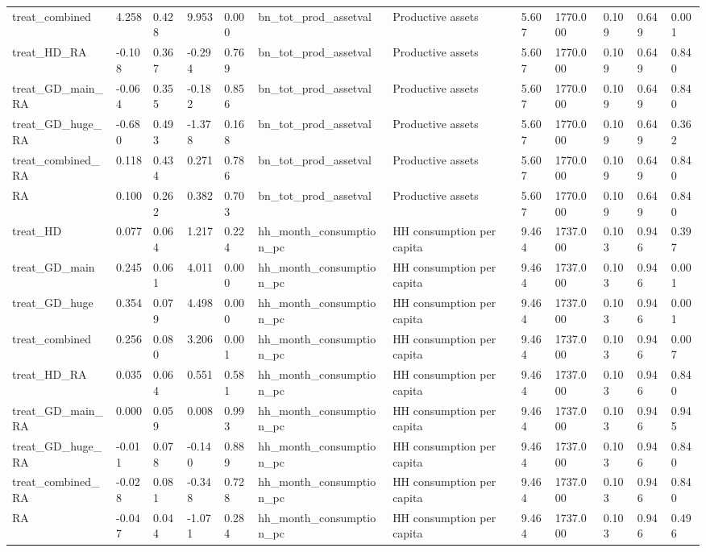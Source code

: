 \begin{tabular}{llllllllllll}
treat\_combined & 4.258 & 0.428 & 9.953 & 0.000 & bn\_tot\_prod\_assetval & Productive assets & 5.607 & 1770.000 & 0.109 & 0.649 & 0.001 \\
treat\_HD\_RA & -0.108 & 0.367 & -0.294 & 0.769 & bn\_tot\_prod\_assetval & Productive assets & 5.607 & 1770.000 & 0.109 & 0.649 & 0.840 \\
treat\_GD\_main\_RA & -0.064 & 0.355 & -0.182 & 0.856 & bn\_tot\_prod\_assetval & Productive assets & 5.607 & 1770.000 & 0.109 & 0.649 & 0.840 \\
treat\_GD\_huge\_RA & -0.680 & 0.493 & -1.378 & 0.168 & bn\_tot\_prod\_assetval & Productive assets & 5.607 & 1770.000 & 0.109 & 0.649 & 0.362 \\
treat\_combined\_RA & 0.118 & 0.434 & 0.271 & 0.786 & bn\_tot\_prod\_assetval & Productive assets & 5.607 & 1770.000 & 0.109 & 0.649 & 0.840 \\
RA & 0.100 & 0.262 & 0.382 & 0.703 & bn\_tot\_prod\_assetval & Productive assets & 5.607 & 1770.000 & 0.109 & 0.649 & 0.840 \\
treat\_HD & 0.077 & 0.064 & 1.217 & 0.224 & hh\_month\_consumption\_pc & HH consumption per capita & 9.464 & 1737.000 & 0.103 & 0.946 & 0.397 \\
treat\_GD\_main & 0.245 & 0.061 & 4.011 & 0.000 & hh\_month\_consumption\_pc & HH consumption per capita & 9.464 & 1737.000 & 0.103 & 0.946 & 0.001 \\
treat\_GD\_huge & 0.354 & 0.079 & 4.498 & 0.000 & hh\_month\_consumption\_pc & HH consumption per capita & 9.464 & 1737.000 & 0.103 & 0.946 & 0.001 \\
treat\_combined & 0.256 & 0.080 & 3.206 & 0.001 & hh\_month\_consumption\_pc & HH consumption per capita & 9.464 & 1737.000 & 0.103 & 0.946 & 0.007 \\
treat\_HD\_RA & 0.035 & 0.064 & 0.551 & 0.581 & hh\_month\_consumption\_pc & HH consumption per capita & 9.464 & 1737.000 & 0.103 & 0.946 & 0.840 \\
treat\_GD\_main\_RA & 0.000 & 0.059 & 0.008 & 0.993 & hh\_month\_consumption\_pc & HH consumption per capita & 9.464 & 1737.000 & 0.103 & 0.946 & 0.945 \\
treat\_GD\_huge\_RA & -0.011 & 0.078 & -0.140 & 0.889 & hh\_month\_consumption\_pc & HH consumption per capita & 9.464 & 1737.000 & 0.103 & 0.946 & 0.840 \\
treat\_combined\_RA & -0.028 & 0.081 & -0.348 & 0.728 & hh\_month\_consumption\_pc & HH consumption per capita & 9.464 & 1737.000 & 0.103 & 0.946 & 0.840 \\
RA & -0.047 & 0.044 & -1.071 & 0.284 & hh\_month\_consumption\_pc & HH consumption per capita & 9.464 & 1737.000 & 0.103 & 0.946 & 0.496 \\
\bottomrule
\end{tabular}
